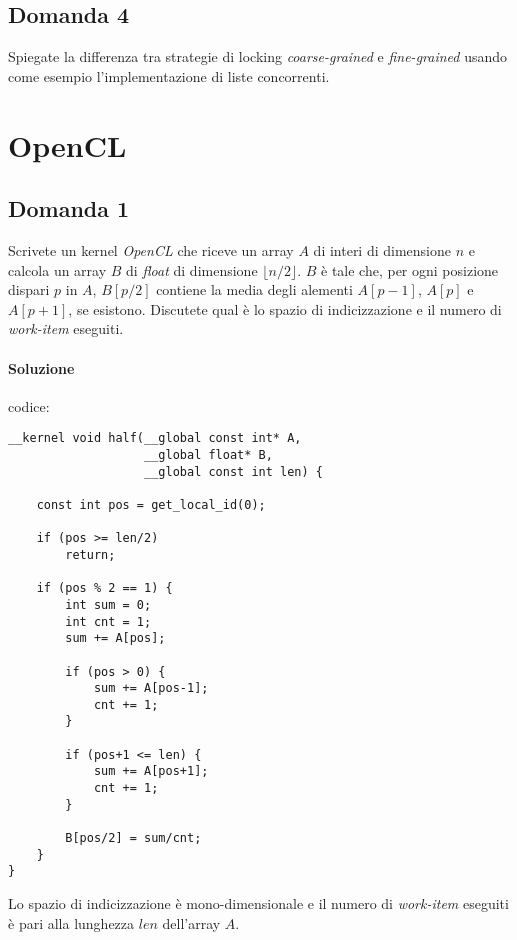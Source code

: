 \newpage

\subsection{Domanda 4}
Spiegate la differenza tra strategie di locking \textit{coarse-grained} e \textit{fine-grained} usando come esempio l'implementazione di liste concorrenti.

\newpage

\section{OpenCL}

\subsection{Domanda 1}
Scrivete un kernel \textit{OpenCL} che riceve un array $A$ di interi di dimensione $n$ e calcola un array $B$ di \textit{float} di dimensione $\lfloor n/2 \rfloor$. $B$ è tale che, per ogni posizione dispari $p$ in $A$, $B[p/2]$ contiene la media degli alementi $A[p-1]$, $A[p]$ e $A[p+1]$, se esistono. Discutete qual è lo spazio di indicizzazione e il numero di \textit{work-item} eseguiti.

\paragraph{Soluzione}
codice:
\begin{lstlisting}
__kernel void half(__global const int* A,
                   __global float* B,
                   __global const int len) {

	const int pos = get_local_id(0);

	if (pos >= len/2)
		return;

	if (pos % 2 == 1) {
		int sum = 0;
		int cnt = 1;
		sum += A[pos];

		if (pos > 0) {
			sum += A[pos-1];
			cnt += 1;
		}

		if (pos+1 <= len) {
			sum += A[pos+1];
			cnt += 1;
		}

		B[pos/2] = sum/cnt;
	}
}
\end{lstlisting}
Lo spazio di indicizzazione è mono-dimensionale e il numero di \textit{work-item} eseguiti è pari alla lunghezza $len$ dell'array $A$.

\newpage

